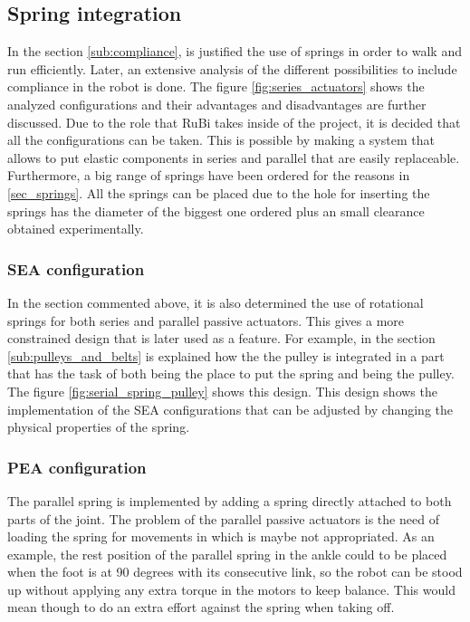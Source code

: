 \subsection{Spring integration} %
\label{sub:spring_integration}
In the section \ref{sub:compliance}, is justified the use of springs in order to walk and run efficiently. 
Later, an extensive analysis of the different possibilities to include compliance in the robot is done.
The figure \ref{fig:series_actuators} shows the analyzed configurations and their advantages and disadvantages are further discussed.
Due to the role that RuBi takes inside of the project, it is decided that all the configurations can be taken.
This is possible by making a system that allows to put elastic components in series and parallel that are easily replaceable.
Furthermore, a big range of springs have been ordered for the reasons in \ref{sec_springs}.
All the springs can be placed due to the hole for inserting the springs has the diameter of the biggest one ordered plus an small clearance obtained experimentally.

\subsubsection{SEA configuration} %
\label{ssub:sea_configuration}

In the section commented above, it is also determined the use of rotational springs for both series and parallel passive actuators.
This gives a more constrained design that is later used as a feature.
For example, in the section \ref{sub:pulleys_and_belts} is explained how the the pulley is integrated in a part that has the task of both being the place to put the spring and being the pulley.
The figure \ref{fig:serial_spring_pulley} shows this design.
This design shows the implementation of the SEA configurations that can be adjusted by changing the physical properties of the spring.

\subsubsection{PEA configuration} %
\label{ssub:pea_configuration}

The parallel spring is implemented by adding a spring directly attached to both parts of the joint.
The problem of the parallel passive actuators is the need of loading the spring for movements in which is maybe not appropriated.
As an example, the rest position of the parallel spring in the ankle could to be placed when the foot is at 90 degrees with its consecutive link, so the robot can be stood up without applying any extra torque in the motors to keep balance.
This would mean though to do an extra effort against the spring when taking off.

